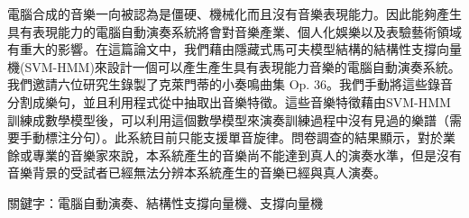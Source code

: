 \begin{abstractCH}

  電腦合成的音樂一向被認為是僵硬、機械化而且沒有音樂表現能力。因此能夠產生具有表現能力的電腦自動演奏系統將會對音樂產業、個人化娛樂以及表驗藝術領域有重大的影響。在這篇論文中，我們藉由隱藏式馬可夫模型結構的結構性支撐向量機(SVM-HMM)來設計一個可以產生產生具有表現能力音樂的電腦自動演奏系統。我們邀請六位研究生錄製了克萊門蒂的小奏鳴曲集 Op. 36。我們手動將這些錄音分割成樂句，並且利用程式從中抽取出音樂特徵。這些音樂特徵藉由SVM-HMM訓練成數學模型後，可以利用這個數學模型來演奏訓練過程中沒有見過的樂譜（需要手動標注分句）。此系統目前只能支援單音旋律。問卷調查的結果顯示，對於業餘或專業的音樂家來說，本系統產生的音樂尚不能達到真人的演奏水準，但是沒有音樂背景的受試者已經無法分辨本系統產生的音樂已經與真人演奏。
  
  關鍵字：電腦自動演奏、結構性支撐向量機、支撐向量機

\end{abstractCH}

